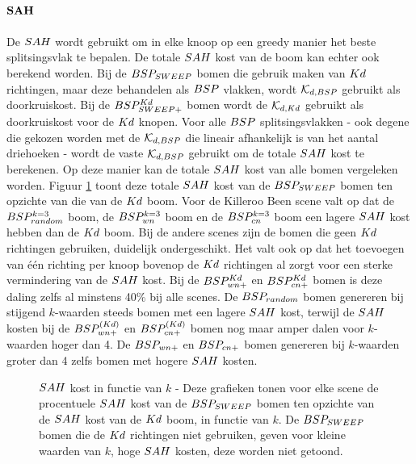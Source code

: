 \paragraph{$\mathbf{SAH}$}
De $\symSAH$ wordt gebruikt om in elke knoop op een greedy manier het beste splitsingsvlak te bepalen. De totale $\symSAH$ kost van de boom kan echter ook berekend worden. Bij de $BSP_{SWEEP}$ bomen die gebruik maken van $Kd$ richtingen, maar deze behandelen als $BSP$ vlakken, wordt $\mathcal{K}_{d,BSP}$ gebruikt als doorkruiskost. Bij de $BSP^{Kd}_{SWEEP+}$ bomen wordt de $\mathcal{K}_{d,Kd}$ gebruikt als doorkruiskost voor de $Kd$ knopen. Voor alle $BSP$ splitsingsvlakken - ook degene die gekozen worden met de $\mathcal{K}_{d,BSP}$ die lineair afhankelijk is van het aantal driehoeken - wordt de vaste $\mathcal{K}_{d,BSP}$ gebruikt om de totale $\symSAH$ kost te berekenen.
Op deze manier kan de totale $\symSAH$ kost van alle bomen vergeleken worden.
Figuur \ref{fig:k-sah} toont deze totale $\symSAH$ kost van de $BSP_{SWEEP}$ bomen ten opzichte van die van de $Kd$ boom. 
Voor de Killeroo Been scene valt op dat de $BSP_{random}^{k=3}$ boom, de $BSP_{wn}^{k=3}$ boom en de $BSP_{cn}^{k=3}$ boom een lagere $\symSAH$ kost hebben dan de $Kd$ boom.
Bij de andere scenes zijn de bomen die geen $Kd$ richtingen gebruiken, duidelijk ondergeschikt.
Het valt ook op dat het toevoegen van één richting per knoop bovenop de $Kd$ richtingen al zorgt voor een sterke vermindering van de $\symSAH$ kost.
Bij de $BSP^{Kd}_{wn+}$ en $BSP^{Kd}_{cn+}$ bomen is deze daling zelfs al minstens 40\% bij alle scenes.
De $BSP_{random}$ bomen genereren bij stijgend $k$-waarden steeds bomen met een lagere $\symSAH$ kost, terwijl de $\symSAH$ kosten bij de $BSP^{(Kd)}_{wn+}$ en $BSP^{(Kd)}_{cn+}$ bomen nog maar amper dalen voor $k$-waarden hoger dan 4. De $BSP_{wn+}$ en $BSP_{cn+}$ bomen genereren bij $k$-waarden groter dan 4 zelfs bomen met hogere $\symSAH$ kosten. 
\begin{figure}[h]
  \centering
  \begin{subfigure}[t]{.32\linewidth}
    \centering
{}
  \end{subfigure}
  \begin{subfigure}[t]{.32\linewidth}
    \centering
{}
\end{subfigure}
\begin{subfigure}[t]{.32\linewidth}
  \centering
{}
\end{subfigure}
\caption[$\symSAH$ kost in functie van $k$]{$\symSAH$ kost in functie van $k$ - \small Deze grafieken tonen voor elke scene de procentuele $\symSAH$ kost van de $BSP_{SWEEP}$ bomen ten opzichte van de $\symSAH$ kost van de $Kd$ boom, in functie van $k$. De $BSP_{SWEEP}$ bomen die de $Kd$ richtingen niet gebruiken, geven voor kleine waarden van $k$, hoge $\symSAH$ kosten, deze worden niet getoond.}
\label{fig:k-sah}
\end{figure}
